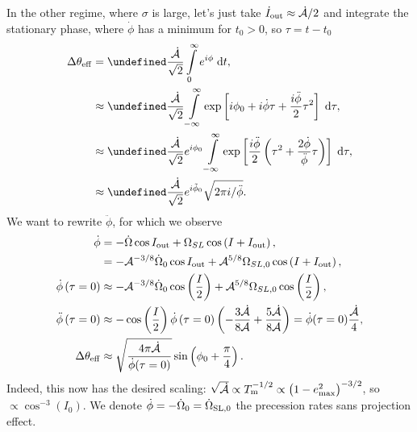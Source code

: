 \documentclass[11pt,
        usenames, %
        dvipsnames %
    ]{article}
\let\Im\undefined
\DeclareMathOperator{\Im}{Im}
\newcommand*{\p}[1]{\left(#1\right)}
\newcommand*{\s}[1]{\left[#1\right]}
\begin{document}
In the other regime, where $\sigma$ is large, let's just take $\dot{I}_{\rm out}
\approx \dot{\mathcal{A}} / 2$ and integrate the stationary phase, where
$\dot{\phi}$ has a minimum for $t_0 > 0$, so $\tau = t - t_0$
\begin{align}
    \Delta \theta_{\rm eff} &= \Im \frac{\dot{\mathcal{A}}}{\sqrt{2}}
            \int\limits_{0}^\infty e^{i\phi}\;\mathrm{d}t,\\
        &\approx \Im \frac{\dot{\mathcal{A}}}{\sqrt{2}}
            \int\limits_{-\infty}^\infty \exp\s{
                i\phi_0 + i\dot{\phi}\tau
                    + \frac{i\ddot{\phi}}{2}\tau^2}\;\mathrm{d}\tau,\\
        &\approx \Im \frac{\dot{\mathcal{A}}}{\sqrt{2}} e^{i\phi_0}
            \int\limits_{-\infty}^\infty \exp\s{
                \frac{i\ddot{\phi}}{2}\p{\tau^2 + \frac{2\dot{\phi}}{\ddot{\phi}}
                    \tau}}\;\mathrm{d}\tau,\\
        &\approx \Im \frac{\dot{\mathcal{A}}}{\sqrt{2}} e^{i\tilde{\phi}_0}
            \sqrt{2\pi i/\ddot{\phi}}.
\end{align}
We want to rewrite $\ddot{\phi}$, for which we observe
\begin{align}
    \dot{\phi} &= -\dot{\Omega} \cos I_{\rm out}
            + \Omega_{SL} \cos \p{I + I_{\rm out}},\\
        &= -\mathcal{A}^{-3/8}\dot{\Omega}_0 \cos I_{\rm out}
            + \mathcal{A}^{5/8}\Omega_{SL, 0}\cos \p{I + I_{\rm out}},\\
    \dot{\phi}\p{\tau = 0} &\approx
        -\mathcal{A}^{-3/8}\dot{\Omega}_0 \cos\p{\frac{I}{2}}
            + \mathcal{A}^{5/8}\Omega_{SL, 0}\cos \p{\frac{I}{2}},\\
    \ddot{\phi}\p{\tau = 0} &\approx
        -\cos \p{\frac{I}{2}} \dot{\phi}\p{\tau = 0}
            \p{-\frac{3\dot{\mathcal{A}}}{8\mathcal{A}}
                + \frac{5\dot{\mathcal{A}}}{8\mathcal{A}}}
                = \dot{\phi}(\tau = 0)\frac{\dot{\mathcal{A}}}{4},\\
    \Delta \theta_{\rm eff} &\approx
        \sqrt{\frac{4\pi \dot{\mathcal{A}}}{\dot{\phi}(\tau = 0)}}
            \sin\p{\phi_0 +  \frac{\pi}{4}}.
\end{align}
Indeed, this now has the desired scaling: $\sqrt{\dot{\mathcal{A}}} \propto
T_{\rm m}^{-1/2} \propto \p{1 - e_{\max}^2} ^{-3/2}$, so $\propto
\cos^{-3}(I_0)$. We denote $\dot{\phi} = -\dot{\Omega}_0 = \dot{\Omega}_{\rm
SL, 0}$ the precession rates sans projection effect.
\end{document}
